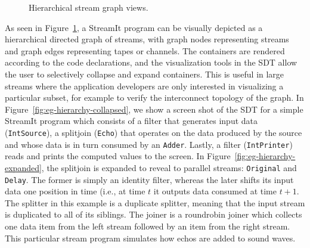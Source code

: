 \documentclass[times, 10pt,twocolumn]{article}
\begin{document}
\begin{figure}[t]
\begin{center}
{    
  }
  \caption{Hierarchical stream graph views.}
  \label{fig:hierarchy}
\end{center}
\end{figure}

As  seen  in Figure~\ref{fig:hierarchy},  a  StreamIt  program can  be
visually depicted  as a hierarchical  directed graph of  streams, with
graph nodes representing streams and graph edges representing tapes or
channels.   The   containers  are  rendered  according   to  the  code
declarations, and the visualization tools in the SDT allow the user to
selectively collapse  and expand containers.  This is  useful in large
streams  where  the  application  developers are  only  interested  in
visualizing   a  particular   subset,  for   example  to   verify  the
interconnect       topology        of       the       graph.        In
Figure~\ref{fig:eg-hierarchy-collapsed}, we show  a screen shot of the
SDT  for a simple  StreamIt program  which consists  of a  filter that
generates input data (\texttt{IntSource}), a splitjoin (\texttt{Echo})
that operates on the data produced  by the source and whose data is in
turn    consumed   by   an    \texttt{Adder}.    Lastly,    a   filter
(\texttt{IntPrinter})  reads and  prints  the computed  values to  the
screen.   In Figure~\ref{fig:eg-hierarchy-expanded}, the  splitjoin is
expanded  to   reveal  to  parallel   streams:  \texttt{Original}  and
\texttt{Delay}. The  former is simply an identity  filter, whereas the
later shifts its input data one position in time (i.e., at time $t$ it
outputs data consumed at time $t+1$. The splitter in this example is a
duplicate splitter, meaning that the input stream is duplicated to all
of its siblings. The joiner  is a roundrobin joiner which collects one
data item  from the  left stream  followed by an  item from  the right
stream. This particular stream program simulates how echos are added
to sound waves.
\end{document}
